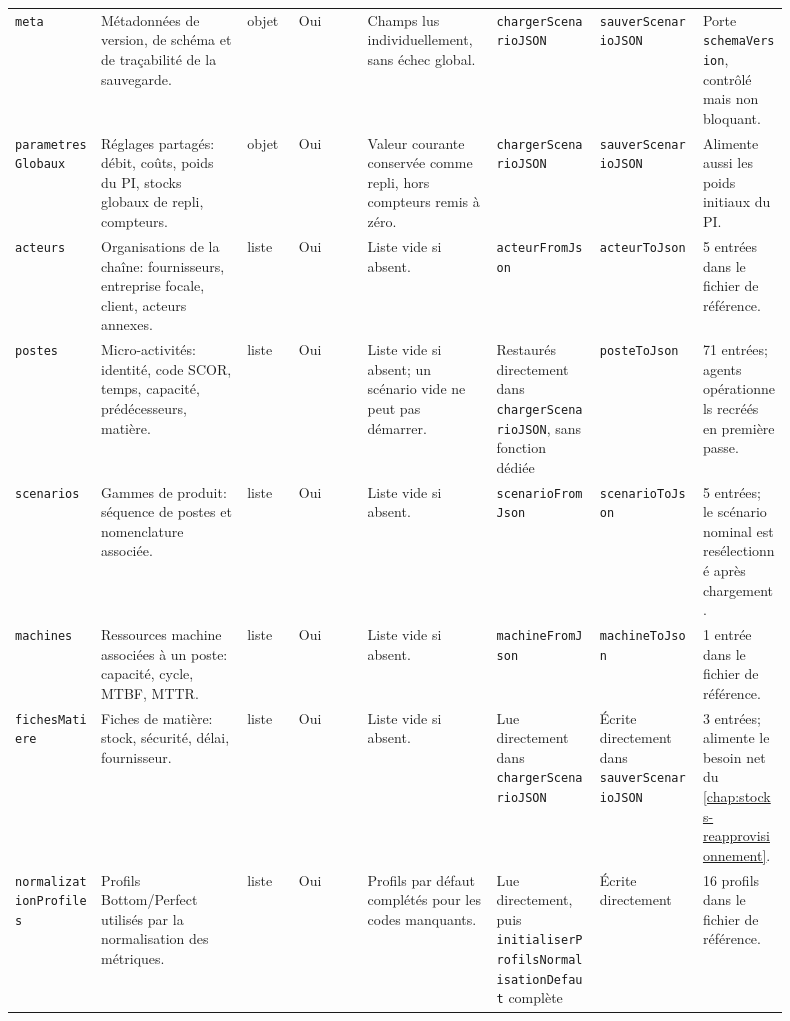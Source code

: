 \begin{landscape}
{\begin{longtable}{L{0.10\linewidth} L{0.17\linewidth} L{0.06\linewidth} L{0.08\linewidth} L{0.15\linewidth} L{0.12\linewidth} L{0.12\linewidth} L{0.10\linewidth}}
\texttt{meta} & Métadonnées de version, de schéma et de traçabilité de la sauvegarde. & objet & Oui & Champs lus individuellement, sans échec global. & \texttt{charger\allowbreak ScenarioJSON} & \texttt{sauver\allowbreak ScenarioJSON} & Porte \texttt{schemaVersion}, contrôlé mais non bloquant. \\
\texttt{parametres\allowbreak Globaux} & Réglages partagés: débit, coûts, poids du PI, stocks globaux de repli, compteurs. & objet & Oui & Valeur courante conservée comme repli, hors compteurs remis à zéro. & \texttt{charger\allowbreak ScenarioJSON} & \texttt{sauver\allowbreak ScenarioJSON} & Alimente aussi les poids initiaux du PI. \\
\texttt{acteurs} & Organisations de la chaîne: fournisseurs, entreprise focale, client, acteurs annexes. & liste & Oui & Liste vide si absent. & \texttt{acteurFromJson} & \texttt{acteurToJson} & 5 entrées dans le fichier de référence. \\
\texttt{postes} & Micro-activités: identité, code SCOR, temps, capacité, prédécesseurs, matière. & liste & Oui & Liste vide si absent; un scénario vide ne peut pas démarrer. & Restaurés directement dans \texttt{charger\allowbreak ScenarioJSON}, sans fonction dédiée & \texttt{posteToJson} & 71 entrées; agents opérationnels recréés en première passe. \\
\texttt{scenarios} & Gammes de produit: séquence de postes et nomenclature associée. & liste & Oui & Liste vide si absent. & \texttt{scenarioFromJson} & \texttt{scenarioToJson} & 5 entrées; le scénario nominal est resélectionné après chargement. \\
\texttt{machines} & Ressources machine associées à un poste: capacité, cycle, MTBF, MTTR. & liste & Oui & Liste vide si absent. & \texttt{machineFromJson} & \texttt{machineToJson} & 1 entrée dans le fichier de référence. \\
\texttt{fichesMatiere} & Fiches de matière: stock, sécurité, délai, fournisseur. & liste & Oui & Liste vide si absent. & Lue directement dans \texttt{charger\allowbreak ScenarioJSON} & Écrite directement dans \texttt{sauver\allowbreak ScenarioJSON} & 3 entrées; alimente le besoin net du \cref{chap:stocks-reapprovisionnement}. \\
\texttt{normalization\allowbreak Profiles} & Profils Bottom/Perfect utilisés par la normalisation des métriques. & liste & Oui & Profils par défaut complétés pour les codes manquants. & Lue directement, puis \texttt{initialiser\allowbreak Profils\allowbreak Normalisation\allowbreak Defaut} complète & Écrite directement & 16 profils dans le fichier de référence. \\

\end{longtable}}
\end{landscape}
